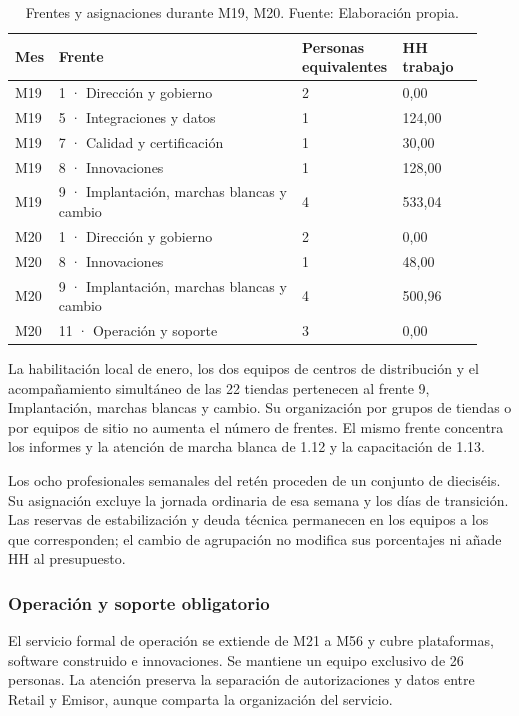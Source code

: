 \documentclass[11pt]{article}
\begin{document}
\begingroup
\small
\begin{longtable}{@{}p{0.08\linewidth}p{0.51\linewidth}p{0.17\linewidth}p{0.17\linewidth}@{}}
\caption[Frentes y asignaciones durante M19, M20]{Frentes y asignaciones durante M19, M20. Fuente: Elaboración propia.}\label{tab:t15-frentes-19}\\
\toprule
\textbf{Mes} & \textbf{Frente} & \textbf{Personas equivalentes} & \textbf{HH trabajo} \\
\midrule
\endhead
\bottomrule
\endlastfoot
M19 & 1 · Dirección y gobierno & 2 & 0,00 \\
M19 & 5 · Integraciones y datos & 1 & 124,00 \\
M19 & 7 · Calidad y certificación & 1 & 30,00 \\
M19 & 8 · Innovaciones & 1 & 128,00 \\
M19 & 9 · Implantación, marchas blancas y cambio & 4 & 533,04 \\
M20 & 1 · Dirección y gobierno & 2 & 0,00 \\
M20 & 8 · Innovaciones & 1 & 48,00 \\
M20 & 9 · Implantación, marchas blancas y cambio & 4 & 500,96 \\
M20 & 11 · Operación y soporte & 3 & 0,00 \\
\end{longtable}
\endgroup

La habilitación local de enero, los dos equipos de centros de distribución y el acompañamiento simultáneo de las 22 tiendas pertenecen al frente 9, Implantación, marchas blancas y cambio. Su organización por grupos de tiendas o por equipos de sitio no aumenta el número de frentes. El mismo frente concentra los informes y la atención de marcha blanca de 1.12 y la capacitación de 1.13.

Los ocho profesionales semanales del retén proceden de un conjunto de dieciséis. Su asignación excluye la jornada ordinaria de esa semana y los días de transición. Las reservas de estabilización y deuda técnica permanecen en los equipos a los que corresponden; el cambio de agrupación no modifica sus porcentajes ni añade HH al presupuesto.

\subsubsection{Operación y soporte obligatorio}

El servicio formal de operación se extiende de M21 a M56 y cubre plataformas, software construido e innovaciones. Se mantiene un equipo exclusivo de 26 personas. La atención preserva la separación de autorizaciones y datos entre Retail y Emisor, aunque comparta la organización del servicio.
\end{document}
